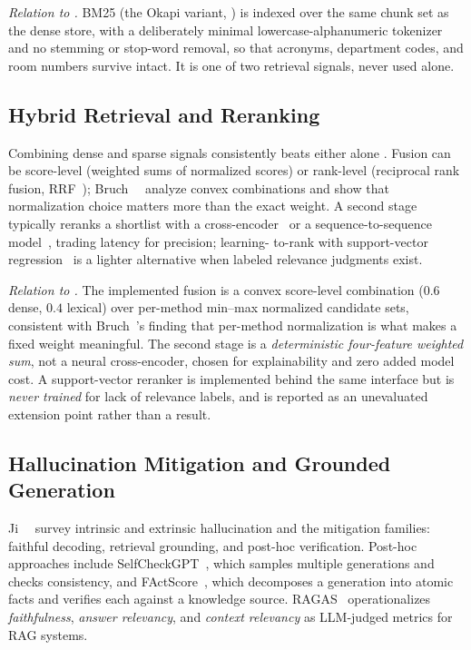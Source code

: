 \emph{Relation to \system{}.} BM25 (the Okapi variant, )
is indexed over the same chunk set as the dense store, with a deliberately
minimal lowercase-alphanumeric tokenizer and no stemming or stop-word
removal, so that acronyms, department codes, and room numbers survive
intact. It is one of two retrieval signals, never used alone.

\subsection{Hybrid Retrieval and Reranking}
Combining dense and sparse signals consistently beats either alone
\cite{wang2021interpolation}. Fusion can be score-level (weighted sums of
normalized scores) or rank-level (reciprocal rank fusion,
RRF~\cite{cormack2009rrf}); Bruch~\etal~\cite{bruch2023fusion} analyze
convex combinations and show that normalization choice matters more than
the exact weight. A second stage typically reranks a shortlist with a
cross-encoder~\cite{nogueira2019bertrerank} or a sequence-to-sequence
model~\cite{nogueira2020monot5}, trading latency for precision; learning-
to-rank with support-vector regression~\cite{smola2004svr} is a lighter
alternative when labeled relevance judgments exist.

\emph{Relation to \system{}.} The implemented fusion is a convex score-level
combination ($0.6$ dense, $0.4$ lexical) over per-method min--max
normalized candidate sets, consistent with Bruch~\etal's finding that
per-method normalization is what makes a fixed weight meaningful. The
second stage is a \emph{deterministic four-feature weighted sum}, not a
neural cross-encoder, chosen for explainability and zero added model cost.
A support-vector reranker is implemented behind the same interface but is
\emph{never trained} for lack of relevance labels, and is reported as an
unevaluated extension point rather than a result.

\subsection{Hallucination Mitigation and Grounded Generation}
Ji~\etal~\cite{ji2023hallucination} survey intrinsic and extrinsic
hallucination and the mitigation families: faithful decoding, retrieval
grounding, and post-hoc verification. Post-hoc approaches include
SelfCheckGPT~\cite{manakul2023selfcheckgpt}, which samples multiple
generations and checks consistency, and FActScore~\cite{min2023factscore},
which decomposes a generation into atomic facts and verifies each against a
knowledge source. RAGAS~\cite{es2024ragas} operationalizes
\emph{faithfulness}, \emph{answer relevancy}, and \emph{context relevancy}
as LLM-judged metrics for RAG systems.

